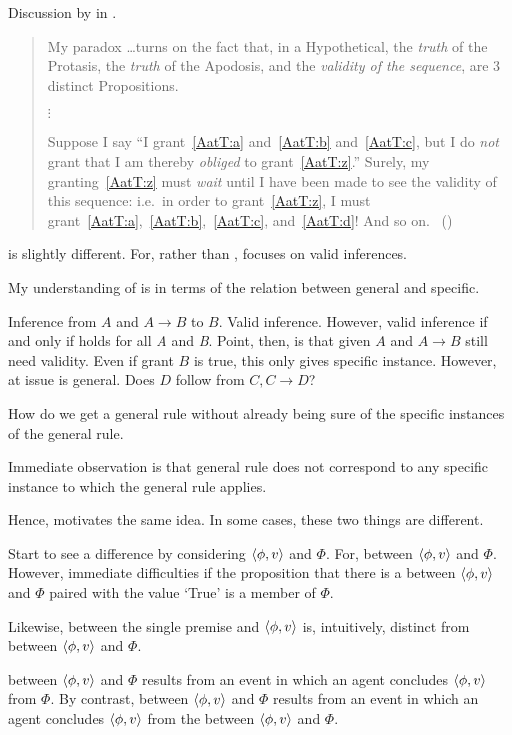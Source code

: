 \begin{note}
  Discussion by \citeauthor{Carroll:1895uj} in .

  \begin{quote}
    My paradox \dots turns on the fact that, in a Hypothetical, the \emph{truth} of the Protasis, the \emph{truth} of the Apodosis, and the \emph{validity of the sequence}, are 3 distinct Propositions.

    \mbox{}\hfill\(\vdots\)\hfill\mbox{}

    Suppose I say ``I grant~\ref{AatT:a} and~\ref{AatT:b} and~\ref{AatT:c}, but I do \emph{not} grant that I am thereby \emph{obliged} to grant~\ref{AatT:z}.''
    Surely, my granting~\ref{AatT:z} must \emph{wait} until I have been made to see the validity of this sequence: i.e.\ in order to grant~\ref{AatT:z}, I must grant~\ref{AatT:a},~\ref{AatT:b},~\ref{AatT:c}, and~\ref{AatT:d}! And so on.%
    \mbox{ }\hfill\mbox{(\citeyear[472]{Carroll:1977wl})}
  \end{quote}

  \citeauthor{Carroll:1895uj} is slightly different.
  For, rather than \ros{}, \citeauthor{Carroll:1895uj} focuses on valid inferences.

  My understanding of \citeauthor{Carroll:1895uj} is in terms of the relation between general and specific.

  Inference from \(A\) and \(A \rightarrow B\) to \(B\).
  Valid inference.
  However, valid inference if and only if holds for all \emph{A} and \emph{B}.
  Point, then, is that given \(A\) and \(A \rightarrow B\) still need validity.
  Even if grant \(B\) is true, this only gives specific instance.
  However, at issue is general.
  Does \(D\) follow from \(C, C \rightarrow D\)?

  How do we get a general rule without already being sure of the specific instances of the general rule.

  Immediate observation is that general rule does not correspond to any specific instance to which the general rule applies.

  Hence, motivates the same idea.
  In some cases, these two things are different.
\end{note}

\begin{note}
  Start to see a difference by considering \(\langle \phi, v \rangle\) and \(\Phi\).
  For, \ros{} between \(\langle \phi, v \rangle\) and \(\Phi\).
  However, immediate difficulties if the proposition that there is a \ros{} between \(\langle \phi, v \rangle\) and \(\Phi\) paired with the value `True' is a member of \(\Phi\).

  Likewise, \ros{} between the single premise and \(\langle \phi, v \rangle\) is, intuitively, distinct from \ros{} between \(\langle \phi, v \rangle\) and \(\Phi\).

  \ros{} between \(\langle \phi, v \rangle\) and \(\Phi\) results from an event in which an agent concludes \(\langle \phi, v \rangle\) from \(\Phi\).
  By contrast, \ros{} between \(\langle \phi, v \rangle\) and \(\Phi\) results from an event in which an agent concludes \(\langle \phi, v \rangle\) from the \ros{} between \(\langle \phi, v \rangle\) and \(\Phi\).
\end{note}

